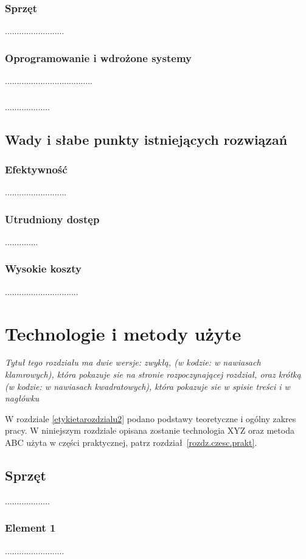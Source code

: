 \documentclass[twoside,12pt]{report}
\begin{document}
\subsection{Sprzęt}
.........................
\subsection{Oprogramowanie i wdrożone systemy}
.....................................
\subsection{}
...................

\section{Wady i słabe punkty istniejących rozwiązań}
\subsection{Efektywność}
..........................
\subsection{Utrudniony dostęp}
..............
\subsection{Wysokie koszty}
...............................


\chapter[Technologie i metody użyte...]{Technologie i metody użyte}

{\em Tytuł tego rozdziału ma dwie wersje: zwykłą, (w kodzie: w nawiasach
klamrowych), która
pokazuje sie na stronie rozpoczynającej rozdział, oraz krótką (w kodzie: w nawiasach
kwadratowych), która pokazuje sie w spisie treści i w nagłówku}

W rozdziale \ref{etykietarozdzialu2} podano podstawy teoretyczne i ogólny zakres
pracy. W niniejszym rozdziale opisana zostanie technologia XYZ oraz metoda ABC
użyta w części praktycznej, patrz rozdział~\ref{rozdz.czesc.prakt}. 


\section{Sprzęt}
...................
\subsection{Element 1}
.........................
\end{document}

